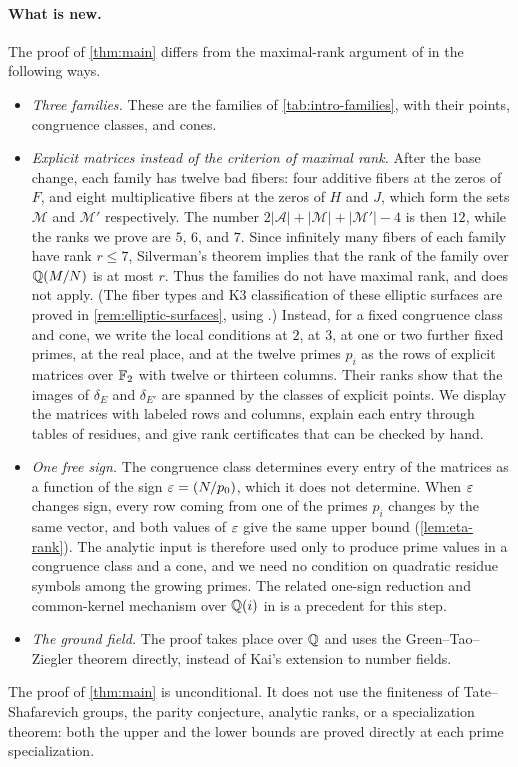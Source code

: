 \paragraph{What is new.} The proof of \cref{thm:main} differs from the maximal-rank argument of \cite{Zywina2026} in the following ways.
\begin{itemize}
\item \emph{Three families.} These are the families of \cref{tab:intro-families}, with their points, congruence classes, and cones.
\item \emph{Explicit matrices instead of the criterion of maximal rank.} After the base change, each family has twelve bad fibers: four additive fibers at the zeros of $F$, and eight multiplicative fibers at the zeros of $H$ and $J$, which form the sets $\mathcal M$ and $\mathcal M'$ respectively. The number $2|\mathcal A|+|\mathcal M|+|\mathcal M'|-4$ is then $12$, while the ranks we prove are $5$, $6$, and $7$. Since infinitely many fibers of each family have rank $r\le 7$, Silverman's theorem \cite[Theorem~C, p.~208]{Silverman1983} implies that the rank of the family over $\mathbb Q(M/N)$ is at most $r$. Thus the families do not have maximal rank, and \cite[Theorem~4.1]{Zywina2026} does not apply. (The fiber types and K3 classification of these elliptic surfaces are proved in \cref{rem:elliptic-surfaces}, using \cite{Tate1975,SchuttShioda2010}.) Instead, for a fixed congruence class and cone, we write the local conditions at $2$, at $3$, at one or two further fixed primes, at the real place, and at the twelve primes $p_i$ as the rows of explicit matrices over $\mathbb F_2$ with twelve or thirteen columns. Their ranks show that the images of $\delta_E$ and $\delta_{E'}$ are spanned by the classes of explicit points. We display the matrices with labeled rows and columns, explain each entry through tables of residues, and give rank certificates that can be checked by hand.
\item \emph{One free sign.} The congruence class determines every entry of the matrices as a function of the sign $\eps=\leg{N}{p_0}$, which it does not determine. When $\varepsilon$ changes sign, every row coming from one of the primes $p_i$ changes by the same vector, and both values of $\varepsilon$ give the same upper bound (\cref{lem:eta-rank}). The analytic input is therefore used only to produce prime values in a congruence class and a cone, and we need no condition on quadratic residue symbols among the growing primes. The related one-sign reduction and common-kernel mechanism over $\mathbb Q(i)$ in \cite[Lemmas~4.1--4.2]{Savoie2026} is a precedent for this step.
\item \emph{The ground field.} The proof takes place over $\mathbb Q$ and uses the Green--Tao--Ziegler theorem directly, instead of Kai's extension to number fields.
\end{itemize}
The proof of \cref{thm:main} is unconditional. It does not use the finiteness of Tate--Shafarevich groups, the parity conjecture, analytic ranks, or a specialization theorem: both the upper and the lower bounds are proved directly at each prime specialization.

